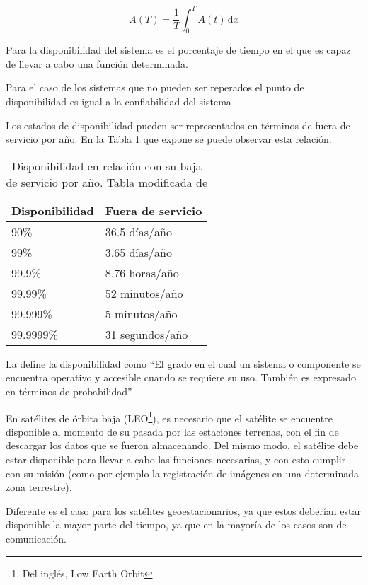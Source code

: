 $$A(T) = \frac{1}{T} \int_0^T \! A(t) \, \mathrm{d}x $$

Para \cite{Hanmer07} la disponibilidad del sistema es el porcentaje de tiempo en el que es capaz de
llevar a cabo una función determinada.

Para el caso de los sistemas que no pueden ser reperados el punto de disponibilidad es igual a la
confiabilidad del sistema \citep{FTDesign}.

Los estados de disponibilidad pueden ser representados en términos de fuera de servicio por año. En
la Tabla \ref{table:avalVSdowntime} que expone \cite{FTDesign} se puede observar esta relación.

\begin{table}[h]
  \centering
  \begin{tabular}{l|l}
    \hline
    Disponibilidad & Fuera de servicio \\ \hline
    90\%           & 36.5 días/año     \\
    99\%           & 3.65 días/año     \\
    99.9\%         & 8.76 horas/año    \\
    99.99\%        & 52 minutos/año    \\
    99.999\%       & 5 minutos/año     \\
    99.9999\%      & 31 segundos/año   \\ \hline
  \end{tabular}
  \caption{Disponibilidad en relación con su baja de servicio por año. Tabla
modificada de \protect\cite{FTDesign}}
  \label{table:avalVSdowntime}
\end{table}

La \cite{IEEE610.12} define la disponibilidad como ``El grado en el cual un sistema o
componente se encuentra operativo y accesible cuando se requiere su uso. También es expresado en
términos de probabilidad''

En satélites de órbita baja (LEO\footnote{Del inglés, Low Earth Orbit}), es necesario que el
satélite se encuentre disponible al momento de su pasada por las estaciones terrenas, con el fin de 
descargar los datos que se fueron almacenando. Del mismo modo, el satélite debe estar disponible
para llevar a cabo las funciones necesarias, y con esto cumplir con su misión (como por ejemplo la
registración de imágenes en una determinada zona terrestre).

Diferente es el caso para los satélites geoestacionarios, ya que estos deberían estar disponible la
mayor parte del tiempo, ya que en la mayoría de los casos son de comunicación.

